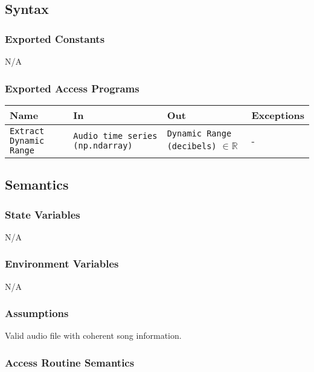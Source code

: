 \documentclass[12pt, titlepage]{article}
\begin{document}
\subsection{Syntax}

\subsubsection{Exported Constants}
N/A

\subsubsection{Exported Access Programs}

\begin{center}
\begin{tabular}{p{2cm} p{4cm} p{4cm} p{2cm}}
\hline
\textbf{Name} & \textbf{In} & \textbf{Out} & \textbf{Exceptions}\\
\hline%
\texttt{Extract Dynamic Range} &\texttt{Audio time series (np.ndarray)} &\texttt{Dynamic Range (decibels)} $\in \mathbb{R}$ &-\\
\hline
\end{tabular}
\end{center}

\subsection{Semantics}

\subsubsection{State Variables}
N/A

\subsubsection{Environment Variables}
N/A

\subsubsection{Assumptions}
Valid audio file with coherent song information.

\subsubsection{Access Routine Semantics}
\end{document}
